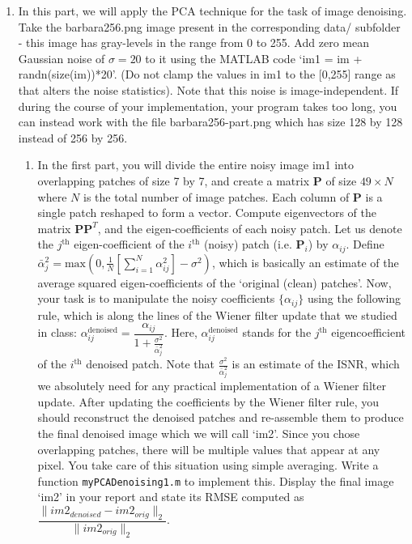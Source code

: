 \documentclass[11pt]{article}
\begin{document}
\begin{enumerate}
\item In this part, we will apply the PCA technique for the task of image denoising. Take the barbara256.png image present in the corresponding data/ subfolder - this image has gray-levels in the range from 0 to 255. Add zero mean Gaussian noise of $\sigma = 20$ to it using the MATLAB code `im1 = im + randn(size(im))*20'. (Do not clamp the values in im1 to the [0,255] range as that alters the noise statistics). Note that this noise is image-independent. If during the course of your implementation, your program takes too long, you can instead work with the file barbara256-part.png which has size 128 by 128 instead of 256 by 256. 
\begin{enumerate}
\item In the first part, you will divide the entire noisy image im1 into overlapping patches of size 7 by 7, and create a matrix $\mathbf{P}$ of size $49 \times N$ where $N$ is the total number of image patches. Each column of $\mathbf{P}$ is a single patch reshaped to form a vector. Compute eigenvectors of the matrix $\mathbf{PP}^T$, and the eigen-coefficients of each noisy patch. 
Let us denote the $j^{\textrm{th}}$ eigen-coefficient of the $i^{\textrm{th}}$ (noisy) patch (i.e. $\mathbf{P}_i$) by $\alpha_{ij}$. Define $\bar{\alpha}^2_j = \textrm{max}(0,\frac{1}{N}[\sum_{i=1}^N \alpha^2_{ij}] - \sigma^2)$, which is basically an estimate of the average squared eigen-coefficients of the `original (clean) patches'. Now, your task is to manipulate the noisy coefficients $\{\alpha_{ij}\}$ using the following rule, which is along the lines of the Wiener filter update that we studied in class:
$\alpha^{\textrm{denoised}}_{ij} = \dfrac{\alpha_{ij}}{1 + \frac{\sigma^2}{\bar{\alpha}^2_j}}$.
Here, $\alpha^{\textrm{denoised}}_{ij}$ stands for the $j^{\textrm{th}}$ eigencoefficient of the $i^{\textrm{th}}$ denoised patch. Note that $\frac{\sigma^2}{\bar{\alpha}^2_j}$ is an estimate of the ISNR, which we absolutely need for any practical implementation of a Wiener filter update.  After updating the coefficients by the Wiener filter rule, you should reconstruct the denoised patches and re-assemble them to produce the final denoised image which we will call `im2'. Since you chose overlapping patches, there will be multiple values that appear at any pixel. You take care of this situation using simple averaging. Write a function \texttt{myPCADenoising1.m} to implement this. Display the final image `im2' in your report and state its RMSE computed as $\dfrac{\|im2_{denoised}-im2_{orig}\|_2}{\|im2_{orig}\|_2}$. 

\end{enumerate}
\end{enumerate}
\end{document}
